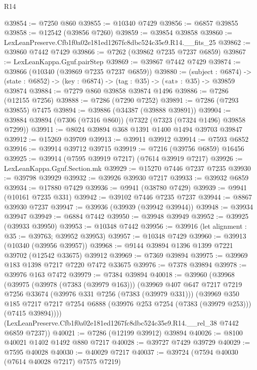 \begin{lexlean}{R14}
\begin{coremodule}
@39854 := @7250 @860
@39855 := @10340 @7429
@39856 := @6857 @39855
@39858 := @12542 (@39856 @7260)
@39859 := @39854 @39858
@39860 := LexLeanPreserve.Cfb1f0a02e181ed1267fc8dbc524c35e9.R14.__fits_25
@39862 := @39860 @7442 @7429
@39866 := @7262 (@39862 @7235 @7237 @6859)
@39867 := LexLeanKappa.Gguf.pairStep
@39869 := @39867 @7442 @7429
@39874 := @39866 (@10340 (@39869 @7235 @7237 @6859))
@39880 := (subject : @6874) ->
  (state : @6852) -> (key : @6874) -> (tag : @35) -> («at» : @35) -> @39859 @39874
@39884 := @7279 @860 @39858 @39874 @1496
@39886 := @7286 (@12155 @7256)
@39888 := @7286 (@7290 @7252)
@39891 := @7286 (@7293 @39855) @7475
@39894 := @39886 (@34387 (@39888 @39891))
@39904 := @39884 @39894 (@7306 (@7316 @860)) (@7322 (@7323 (@7324 @1496) @39858 @7299))
@39911 := @8024 @39894 @368 @1391 @1400 @1494 @39703 @39847
@39912 := @15269 @39709
@39913 := @39911 @39912
@39914 := @7593 @6852
@39916 := @39914 @39712 @39715
@39919 := @7216 (@39756 @6859) @16456
@39925 := @39914 (@7595 @39919 @7217) (@7614 @39919 @7217)
@39926 := LexLeanKappa.Gguf.Section.mk
@39929 := @15270 @7446 @7237 @7235
@39930 := @39798 @39929
@39932 := @39926 @39930 @7217
@39933 := @39932 @6859
@39934 := @17880 @7429
@39936 := @9941 (@38780 @7429)
@39939 := @9941 (@10161 @7235 @331)
@39942 := @39102 @7446 @7235 @7237
@39944 := @8867 @39930 @7237
@39947 := @39936 (@39939 (@39942 @39944))
@39948 := @39934 @39947
@39949 := @6884 @7442
@39950 := @39948 @39949
@39952 := @39925 (@39933 @39950)
@39953 := @10348 @7442
@39956 := @39916 (let alignment : @35 := @39763; @39952 @39953)
@39957 := @10348 @7429
@39960 := @39913 (@10340 (@39956 @39957))
@39968 := @9144 @39894 @1396 @1399 @7221 @39702 (@12542 @33675) @39912
@39969 := @7369 @39894
@39975 := @39969 @183 @1398 @7217 @7220 @7472 @33675
@39976 := @7378 @39894
@39978 := @39976 @163 @7472
@39979 := @7384 @39894
@40018 := @39960
    (@39968
      (@39975
        (@39978 (@7383 (@39979 @163)))
        (@39969
          @407
          @647
          @7217
          @7219
          @7256
          @33674
          (@39976 @331 @7256 (@7383 (@39979 @331)))
          (@39969
            @350
            @185
            @7217
            @7217
            @7254
            @6888
            (@39976 @253 @7254 (@7383 (@39979 @253)))
            (@7415 @39894))))
      (LexLeanPreserve.Cfb1f0a02e181ed1267fc8dbc524c35e9.R14.__rel_38 @7442 @6859 @7237))
@40021 := @7286 (@12199 @39912) @39894
@40026 := @8100 @40021 @1402 @1492 @880 @7217
@40028 := @39727 @7429 @39729
@40029 := @7595 @40028
@40030 := @40029 @7217
@40037 := @39724 (@7594 @40030 (@7614 @40028 @7217) @7575 @7219)

\end{coremodule}
\end{lexlean}
